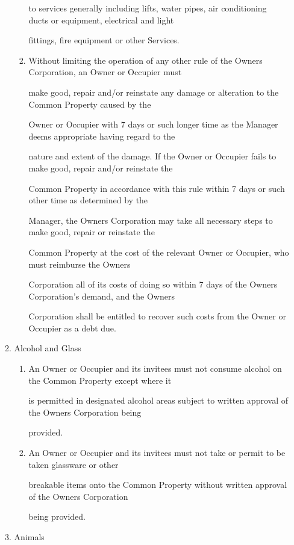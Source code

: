 \documentclass{article}
\begin{document}
\begin{enumerate}[label=\arabic*.]
\begin{enumerate}[label=\arabic{enumi}.\arabic*.]
\begin{enumerate}[label=(\arabic*)]
to services generally including lifts, water pipes, air conditioning ducts or equipment, electrical and light 

fittings, fire equipment or other Services. 

\item  Without limiting the operation of any other rule of the Owners Corporation, an Owner or Occupier must 

make good, repair and/or reinstate any damage or alteration to the Common Property caused by the 

Owner or Occupier with 7 days or such longer time as the Manager deems appropriate having regard to the 

nature and extent of the damage. If the Owner or Occupier fails to make good, repair and/or reinstate the 

Common Property in accordance with this rule within 7 days or such other time as determined by the 

Manager, the Owners Corporation may take all necessary steps to make good, repair or reinstate the 

Common Property at the cost of the relevant Owner or Occupier, who must reimburse the Owners 

Corporation all of its costs of doing so within 7 days of the Owners Corporation’s demand, and the Owners 

Corporation shall be entitled to recover such costs from the Owner or Occupier as a debt due. 

\end{enumerate}
\item  Alcohol and Glass 

\begin{enumerate}[label=(\arabic*)]
\item  An Owner or Occupier and its invitees must not consume alcohol on the Common Property except where it 

is permitted in designated alcohol areas subject to written approval of the Owners Corporation being 

provided. 

\item  An Owner or Occupier and its invitees must not take or permit to be taken glassware or other 

breakable items onto the Common Property without written approval of the Owners Corporation 

being provided. 

\end{enumerate}
\item  Animals 


\end{enumerate}
\end{enumerate}
\end{document}
